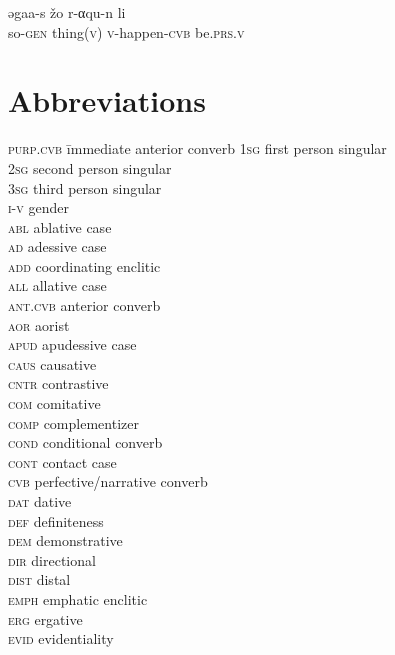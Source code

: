 \documentclass[output=paper]{LSP/langsci}
\begin{document}
\begin{exe}
\gll  əgaa-s žo r-αqu-n li\\
so-\textsc{gen} thing(\textsc{v}) \textsc{v}-happen-\textsc{cvb} be.\textsc{prs.v}  \\
\glt {}
\end{exe}

\section*{Abbreviations}
\begin{multicols}{2}
\begin{tabbing}
\textsc{purp.cvb} \= immediate anterior converb\kill
\textsc{1sg} \> first person singular\\
\textsc{2sg} \> second person singular\\
\textsc{3sg}  \> third person singular\\
\textsc{i-v} \> gender\\
\textsc{abl} \> ablative case\\
\textsc{ad} \> adessive case\\
\textsc{add} \> coordinating enclitic\\
\textsc{all} \> allative case\\
\textsc{ant.cvb} \> anterior converb\\
\textsc{aor} \> aorist\\
\textsc{apud} \> apudessive case\\
\textsc{caus} \> causative\\
\textsc{cntr} \> contrastive\\
\textsc{com} \> comitative\\
\textsc{comp} \> complementizer\\
\textsc{cond} \> conditional converb\\
\textsc{cont} \> contact case\\
\textsc{cvb} \> perfective/narrative converb\\
\textsc{dat} \> dative\\
\textsc{def} \> definiteness\\
\textsc{dem} \> demonstrative\\
\textsc{dir} \> directional\\
\textsc{dist} \> distal\\
\textsc{emph} \> emphatic enclitic\\
\textsc{erg} \> ergative\\
\textsc{evid} \> evidentiality\\

\end{tabbing}
\end{multicols}
\end{document}
